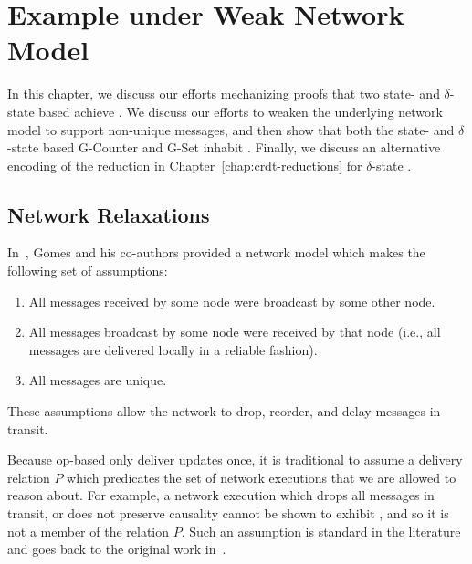 \chapter{Example \CRDTs under Weak Network Model}
\label{chap:example-crdts}

In this chapter, we discuss our efforts mechanizing proofs that two state- and
$\delta$-state based \CRDTs achieve \SEC.  We discuss our efforts to weaken the
underlying network model to support non-unique messages, and then show that both
the state- and $\delta$-state based G-Counter and G-Set inhabit \SEC.  Finally,
we discuss an alternative encoding of the reduction in
Chapter~\ref{chap:crdt-reductions} for $\delta$-state \CRDTs.

\section{Network Relaxations}
\label{sec:network-relaxations}
In~\citep{gomes17}, Gomes and his co-authors provided a network model which
makes the following set of assumptions:
\begin{enumerate}
  \item All messages received by some node were broadcast by some other node.
  \item All messages broadcast by some node were received by that node (i.e.,
    all messages are delivered locally in a reliable fashion).
  \item All messages are unique.
\end{enumerate}
These assumptions allow the network to drop, reorder, and delay messages in
transit.

Because op-based \CRDTs only deliver updates once, it is traditional to assume a
delivery relation $P$ which predicates the set of network executions that we are
allowed to reason about. For example, a network execution which drops all
messages in transit, or does not preserve causality cannot be shown to exhibit
\SEC, and so it is not a member of the relation $P$.  Such an assumption is
standard in the literature and goes back to the original work
in~\citep{shapiro11}.

